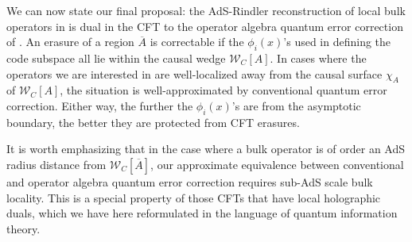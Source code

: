 \documentclass[11pt]{article}
\newcommand{\W}{\mathcal{W}}
\newcommand{\ol}{\overline}
\begin{document}
We can now state our final proposal: the AdS-Rindler reconstruction of local bulk operators in \cite{Hamilton:2006az,Morrison:2014jha} is dual in the CFT to the operator algebra quantum error correction of \cite{beny2007generalization,beny2007quantum}.  An erasure of a region $\ol{A}$ is correctable if the $\phi_i(x)$'s used in defining the code subspace all lie within the causal wedge $\W_C[A]$.  In cases where the operators we are interested in are well-localized away from the causal surface $\chi_A$ of $\W_C[A]$, the situation is well-approximated by conventional quantum error correction.  Either way, the further the $\phi_i(x)$'s are from the asymptotic boundary, the better they are protected from CFT erasures.

It is worth emphasizing that in the case where a bulk operator is of order an AdS radius distance from $\W_C[\ol{A}]$, our approximate equivalence between conventional and operator algebra quantum error correction requires sub-AdS scale bulk locality.  This is a special property of those CFTs that have local holographic duals, which we have here reformulated in the language of quantum information theory.
\end{document}

